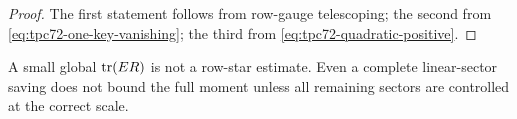 \begin{proof}
The first statement follows from row-gauge telescoping; the second from
\eqref{eq:tpc72-one-key-vanishing}; the third from
\eqref{eq:tpc72-quadratic-positive}.
\end{proof}

A small global \(\operatorname{tr}(ER)\) is not a row-star estimate.  Even a complete
linear-sector saving does not bound the full moment unless all remaining
sectors are controlled at the correct scale.
